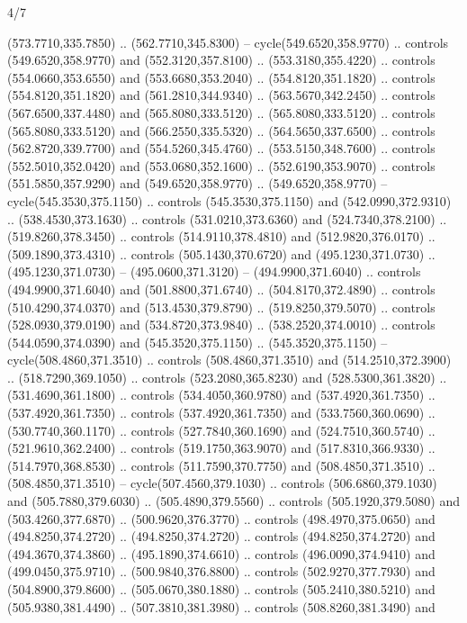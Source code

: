 \begin{flagdescription}{4/7}
\begin{scope}[shift={(0.5\flaglength,0.5\flagwidth)},scale=\flagwidth*\stretchfactor/820]
\begin{scope}[scale=1.87,xshift=-138mm,yshift=75mm]
\begin{scope}[y=0.8pt, x=0.8pt, yscale=-1, xscale=1]
\begin{scope}[fill=c9ca168]
  (573.7710,335.7850) .. (562.7710,345.8300) -- cycle(549.6520,358.9770) ..
  controls (549.6520,358.9770) and (552.3120,357.8100) .. (553.3180,355.4220) ..
  controls (554.0660,353.6550) and (553.6680,353.2040) .. (554.8120,351.1820) ..
  controls (554.8120,351.1820) and (561.2810,344.9340) .. (563.5670,342.2450) ..
  controls (567.6500,337.4480) and (565.8080,333.5120) .. (565.8080,333.5120) ..
  controls (565.8080,333.5120) and (566.2550,335.5320) .. (564.5650,337.6500) ..
  controls (562.8720,339.7700) and (554.5260,345.4760) .. (553.5150,348.7600) ..
  controls (552.5010,352.0420) and (553.0680,352.1600) .. (552.6190,353.9070) ..
  controls (551.5850,357.9290) and (549.6520,358.9770) .. (549.6520,358.9770) --
  cycle(545.3530,375.1150) .. controls (545.3530,375.1150) and
  (542.0990,372.9310) .. (538.4530,373.1630) .. controls (531.0210,373.6360) and
  (524.7340,378.2100) .. (519.8260,378.3450) .. controls (514.9110,378.4810) and
  (512.9820,376.0170) .. (509.1890,373.4310) .. controls (505.1430,370.6720) and
  (495.1230,371.0730) .. (495.1230,371.0730) -- (495.0600,371.3120) --
  (494.9900,371.6040) .. controls (494.9900,371.6040) and (501.8800,371.6740) ..
  (504.8170,372.4890) .. controls (510.4290,374.0370) and (513.4530,379.8790) ..
  (519.8250,379.5070) .. controls (528.0930,379.0190) and (534.8720,373.9840) ..
  (538.2520,374.0010) .. controls (544.0590,374.0390) and (545.3520,375.1150) ..
  (545.3520,375.1150) -- cycle(508.4860,371.3510) .. controls
  (508.4860,371.3510) and (514.2510,372.3900) .. (518.7290,369.1050) .. controls
  (523.2080,365.8230) and (528.5300,361.3820) .. (531.4690,361.1800) .. controls
  (534.4050,360.9780) and (537.4920,361.7350) .. (537.4920,361.7350) .. controls
  (537.4920,361.7350) and (533.7560,360.0690) .. (530.7740,360.1170) .. controls
  (527.7840,360.1690) and (524.7510,360.5740) .. (521.9610,362.2400) .. controls
  (519.1750,363.9070) and (517.8310,366.9330) .. (514.7970,368.8530) .. controls
  (511.7590,370.7750) and (508.4850,371.3510) .. (508.4850,371.3510) --
  cycle(507.4560,379.1030) .. controls (506.6860,379.1030) and
  (505.7880,379.6030) .. (505.4890,379.5560) .. controls (505.1920,379.5080) and
  (503.4260,377.6870) .. (500.9620,376.3770) .. controls (498.4970,375.0650) and
  (494.8250,374.2720) .. (494.8250,374.2720) .. controls (494.8250,374.2720) and
  (494.3670,374.3860) .. (495.1890,374.6610) .. controls (496.0090,374.9410) and
  (499.0450,375.9710) .. (500.9840,376.8800) .. controls (502.9270,377.7930) and
  (504.8900,379.8600) .. (505.0670,380.1880) .. controls (505.2410,380.5210) and
  (505.9380,381.4490) .. (507.3810,381.3980) .. controls (508.8260,381.3490) and

\end{scope}
\end{scope}
\end{scope}
\end{scope}
\end{flagdescription}
